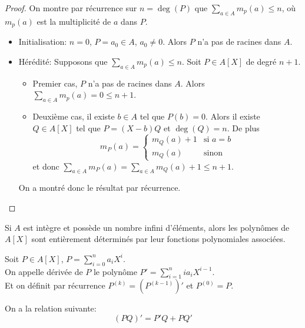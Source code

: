 \begin{proof}
	On montre par récurrence sur $n = \deg(P)$ que $\sum\limits_{a \in A} m_p(a) \leq n$, où $m_p(a)$ est la multiplicité de $a$ dans $P$.

	\begin{itemize}
		\item Initialisation: $n = 0$, $P = a_0 \in A$, $a_0 \neq 0$.
		      Alors $P$ n'a pas de racines dans $A$.
		\item Hérédité: Supposons que $\sum\limits_{a \in A} m_p(a) \leq n$. Soit $P \in A[X]$ de degré $n+1$.
		      \begin{itemize}
			      \item Premier cas, $P$ n'a pas de racines dans $A$.
			            Alors $\sum\limits_{a \in A} m_p(a) = 0 \leq n+1$.
			      \item Deuxième cas, il existe $b \in A$ tel que $P(b) = 0$.
			            Alors il existe $Q \in A[X]$ tel que $P = (X-b)Q$
			            et $\deg(Q) = n$. De plus
			            $$ m_P(a) = \left\{ \begin{array}{ll}
					            m_Q(a) + 1 & \text{si } a = b \\
					            m_Q(a)     & \text{sinon}
				            \end{array} \right. $$
			            et donc $\sum\limits_{a \in A} m_P(a) = \sum\limits_{a \in A} m_Q(a) + 1 \leq n+1$.
		      \end{itemize}

		      On a montré donc le résultat par récurrence.
	\end{itemize}
\end{proof}

\begin{coro}
	Si $A$ est intègre et possède un nombre infini d'éléments, alors les polynômes de $A[X]$ sont entièrement déterminés par leur fonctions polynomiales associées.
\end{coro}

\begin{definition}
	Soit $P \in A[X]$, $P = \sum\limits_{i=0}^n a_iX^i$. \\
	On appelle dérivée de $P$ le polynôme $P' = \sum\limits_{i=1}^n ia_iX^{i-1}$.\\
	Et on définit par récurrence $P^{(k)} = (P^{(k-1)})'$ et $P^{(0)} = P$.
\end{definition}

\begin{prop}
	On a la relation suivante:
	$$ (PQ)' = P'Q + PQ' $$
\end{prop}

